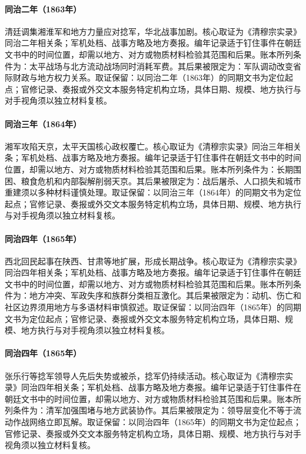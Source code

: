 \hypertarget{ledger:EQ-1863-NIAN-WAR-MOBILIZATION}{}\paragraph{同治二年（1863年）}清廷调集湘淮军和地方力量应对捻军，华北战事加剧。核心取证为《清穆宗实录》同治二年相关条；军机处档、战事方略及地方奏报。编年记录适于钉住事件在朝廷文书中的时间位置，却需以地方、对方或物质材料检验其范围和后果。账本所列条件为：太平战场与北方流动战场同时消耗军费。其后果被限定为：军队调动改变省际财政与地方权力关系。取证保留：以同治二年（1863年）的同期文书为定位起点；官修记录、奏报或外交文本服务特定机构立场，具体日期、规模、地方执行与对手视角须以独立材料复核。
\hypertarget{ledger:EQ-1864-TIANJING-FALL}{}\paragraph{同治三年（1864年）}湘军攻陷天京，太平天国核心政权覆亡。核心取证为《清穆宗实录》同治三年相关条；军机处档、战事方略及地方奏报。编年记录适于钉住事件在朝廷文书中的时间位置，却需以地方、对方或物质材料检验其范围和后果。账本所列条件为：长期围困、粮食危机和内部裂解削弱天京。其后果被限定为：战后屠杀、人口损失和城市重建须以多种材料谨慎处理。取证保留：以同治三年（1864年）的同期文书为定位起点；官修记录、奏报或外交文本服务特定机构立场，具体日期、规模、地方执行与对手视角须以独立材料复核。
\hypertarget{ledger:EQ-1865-DUNGAN-REVOLT}{}\paragraph{同治四年（1865年）}西北回民起事在陕西、甘肃等地扩展，形成长期战争。核心取证为《清穆宗实录》同治四年相关条；军机处档、战事方略及地方奏报。编年记录适于钉住事件在朝廷文书中的时间位置，却需以地方、对方或物质材料检验其范围和后果。账本所列条件为：地方冲突、军政失序和族群分类相互激化。其后果被限定为：动机、伤亡和社区边界须用地方与多语材料审慎叙述。取证保留：以同治四年（1865年）的同期文书为定位起点；官修记录、奏报或外交文本服务特定机构立场，具体日期、规模、地方执行与对手视角须以独立材料复核。
\hypertarget{ledger:EQ-1865-NIAN-LEADER-DEATH}{}\paragraph{同治四年（1865年）}张乐行等捻军领导人先后失势或被杀，捻军仍持续活动。核心取证为《清穆宗实录》同治四年相关条；军机处档、战事方略及地方奏报。编年记录适于钉住事件在朝廷文书中的时间位置，却需以地方、对方或物质材料检验其范围和后果。账本所列条件为：清军加强围堵与地方武装协作。其后果被限定为：领导层变化不等于流动作战网络立即瓦解。取证保留：以同治四年（1865年）的同期文书为定位起点；官修记录、奏报或外交文本服务特定机构立场，具体日期、规模、地方执行与对手视角须以独立材料复核。

